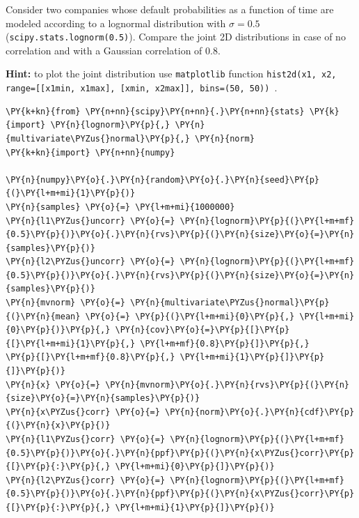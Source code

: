 \begin{Exercise}[title={(Copula)}]
Consider two companies whose default probabilities as a function of time are modeled according to a lognormal distribution with $\sigma =0.5$ (\texttt{scipy.stats.lognorm(0.5)}). Compare the joint 2D distributions in case of no correlation and with a Gaussian correlation of 0.8.

\textbf{Hint:} to plot the joint distribution use \texttt{matplotlib} function \texttt{hist2d(x1, x2, range=[[x1min, x1max], [xmin, x2max]], bins=(50, 50)) }.
\end{Exercise}

\begin{Answer}
\begin{codebox}[size=fbox, boxrule=1pt, colback=cellbackground, colframe=cellborder]
\begin{Verbatim}[commandchars=\\\{\}]
\PY{k+kn}{from} \PY{n+nn}{scipy}\PY{n+nn}{.}\PY{n+nn}{stats} \PY{k}{import} \PY{n}{lognorm}\PY{p}{,} \PY{n}{multivariate\PYZus{}normal}\PY{p}{,} \PY{n}{norm}
\PY{k+kn}{import} \PY{n+nn}{numpy}
		
\PY{n}{numpy}\PY{o}{.}\PY{n}{random}\PY{o}{.}\PY{n}{seed}\PY{p}{(}\PY{l+m+mi}{1}\PY{p}{)}
\PY{n}{samples} \PY{o}{=} \PY{l+m+mi}{1000000}
\PY{n}{l1\PYZus{}uncorr} \PY{o}{=} \PY{n}{lognorm}\PY{p}{(}\PY{l+m+mf}{0.5}\PY{p}{)}\PY{o}{.}\PY{n}{rvs}\PY{p}{(}\PY{n}{size}\PY{o}{=}\PY{n}{samples}\PY{p}{)}
\PY{n}{l2\PYZus{}uncorr} \PY{o}{=} \PY{n}{lognorm}\PY{p}{(}\PY{l+m+mf}{0.5}\PY{p}{)}\PY{o}{.}\PY{n}{rvs}\PY{p}{(}\PY{n}{size}\PY{o}{=}\PY{n}{samples}\PY{p}{)}
\PY{n}{mvnorm} \PY{o}{=} \PY{n}{multivariate\PYZus{}normal}\PY{p}{(}\PY{n}{mean} \PY{o}{=} \PY{p}{(}\PY{l+m+mi}{0}\PY{p}{,} \PY{l+m+mi}{0}\PY{p}{)}\PY{p}{,} \PY{n}{cov}\PY{o}{=}\PY{p}{[}\PY{p}{[}\PY{l+m+mi}{1}\PY{p}{,} \PY{l+m+mf}{0.8}\PY{p}{]}\PY{p}{,}
\PY{p}{[}\PY{l+m+mf}{0.8}\PY{p}{,} \PY{l+m+mi}{1}\PY{p}{]}\PY{p}{]}\PY{p}{)}
\PY{n}{x} \PY{o}{=} \PY{n}{mvnorm}\PY{o}{.}\PY{n}{rvs}\PY{p}{(}\PY{n}{size}\PY{o}{=}\PY{n}{samples}\PY{p}{)}
\PY{n}{x\PYZus{}corr} \PY{o}{=} \PY{n}{norm}\PY{o}{.}\PY{n}{cdf}\PY{p}{(}\PY{n}{x}\PY{p}{)}
\PY{n}{l1\PYZus{}corr} \PY{o}{=} \PY{n}{lognorm}\PY{p}{(}\PY{l+m+mf}{0.5}\PY{p}{)}\PY{o}{.}\PY{n}{ppf}\PY{p}{(}\PY{n}{x\PYZus{}corr}\PY{p}{[}\PY{p}{:}\PY{p}{,} \PY{l+m+mi}{0}\PY{p}{]}\PY{p}{)}
\PY{n}{l2\PYZus{}corr} \PY{o}{=} \PY{n}{lognorm}\PY{p}{(}\PY{l+m+mf}{0.5}\PY{p}{)}\PY{o}{.}\PY{n}{ppf}\PY{p}{(}\PY{n}{x\PYZus{}corr}\PY{p}{[}\PY{p}{:}\PY{p}{,} \PY{l+m+mi}{1}\PY{p}{]}\PY{p}{)}
		

\end{Verbatim}
\end{codebox}
\end{Answer}
